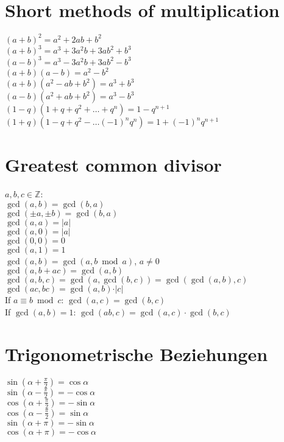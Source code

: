 \documentclass[a4paper, 10pt]{scrartcl}
\begin{document}
\section*{Short methods of multiplication}
$(a + b)^{2} = a^{2} + 2ab + b^{2}$\\
$(a + b)^{3} = a^{3} + 3a^{2}b + 3ab^{2} + b^{3}$\\
$(a - b)^{3} = a^{3} - 3a^{2}b + 3ab^{2} - b^{3}$\\
$(a + b)(a - b) = a^{2} - b^{2}$\\
$(a + b)(a^{2} - ab + b^{2}) = a^{3} + b^{3}$\\
$(a - b)(a^{2} + ab + b^{2}) = a^{3} - b^{3}$\\
$(1 - q)(1 + q + q^{2} + \dots + q^{n}) = 1 - q^{n+1}$\\
$(1 + q)(1 - q + q^{2} - \dots (-1)^{n}q^{n}) = 1 + (-1)^{n}q^{n+1}$\\

\section*{Greatest common divisor}
$a, b, c\in \mathbb{Z}$:\\
$\gcd(a, b) = \gcd(b, a)$\\
$\gcd(\pm a, \pm b) = \gcd(b, a)$\\
$\gcd(a, a) = \vert a\vert$\\
$\gcd(a, 0) = \vert a\vert$\\
$\gcd(0, 0) = 0$\\
$\gcd(a, 1) = 1$\\
$\gcd(a, b) = \gcd(a, b\bmod a)$, $a\neq 0$\\
$\gcd(a, b + ac) = \gcd(a, b)$\\
$\gcd(a, b, c) = \gcd(a, \gcd(b, c)) = \gcd(\gcd(a, b), c)$\\
$\gcd(ac, bc) = \gcd(a, b)\cdot\vert c\vert$\\
If $a\equiv b\bmod c$: $\gcd(a, c) = \gcd(b, c)$\\
If $\gcd(a, b) = 1$: $\gcd(ab, c) = \gcd(a, c)\cdot\gcd(b, c)$\\

\section*{Trigonometrische Beziehungen}
$\sin{(\alpha + \frac{\pi}{2})} = \cos{\alpha}$\\
$\sin{(\alpha - \frac{\pi}{2})} = -\cos{\alpha}$\\
$\cos{(\alpha + \frac{\pi}{2})} = -\sin{\alpha}$\\
$\cos{(\alpha - \frac{\pi}{2})} = \sin{\alpha}$\\
$\sin{(\alpha + \pi)} = -\sin{\alpha}$\\
$\cos{(\alpha + \pi)} = -\cos{\alpha}$\\
\end{document}
